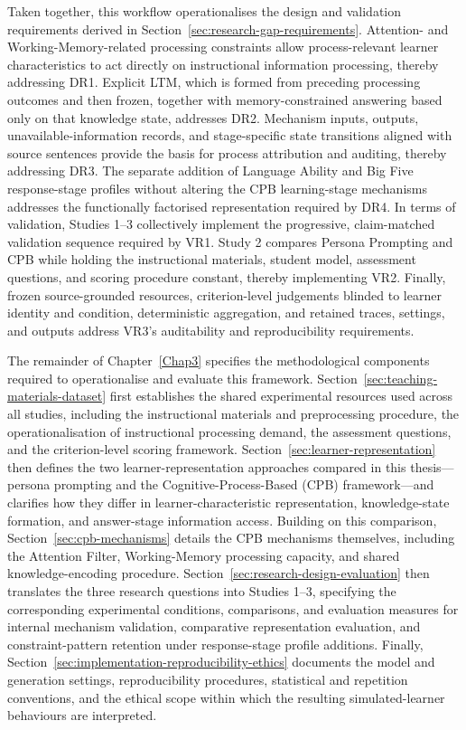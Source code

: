 Taken together, this workflow operationalises the design and validation requirements derived in Section~\ref{sec:research-gap-requirements}. Attention- and Working-Memory-related processing constraints allow process-relevant learner characteristics to act directly on instructional information processing, thereby addressing DR1. Explicit LTM, which is formed from preceding processing outcomes and then frozen, together with memory-constrained answering based only on that knowledge state, addresses DR2. Mechanism inputs, outputs, unavailable-information records, and stage-specific state transitions aligned with source sentences provide the basis for process attribution and auditing, thereby addressing DR3. The separate addition of Language Ability and Big Five response-stage profiles without altering the CPB learning-stage mechanisms addresses the functionally factorised representation required by DR4. In terms of validation, Studies 1--3 collectively implement the progressive, claim-matched validation sequence required by VR1. Study 2 compares Persona Prompting and CPB while holding the instructional materials, student model, assessment questions, and scoring procedure constant, thereby implementing VR2. Finally, frozen source-grounded resources, criterion-level judgements blinded to learner identity and condition, deterministic aggregation, and retained traces, settings, and outputs address VR3's auditability and reproducibility requirements.

The remainder of Chapter~\ref{Chap3} specifies the methodological components required to operationalise and evaluate this framework. Section~\ref{sec:teaching-materials-dataset} first establishes the shared experimental resources used across all studies, including the instructional materials and preprocessing procedure, the operationalisation of instructional processing demand, the assessment questions, and the criterion-level scoring framework. Section~\ref{sec:learner-representation} then defines the two learner-representation approaches compared in this thesis---persona prompting and the Cognitive-Process-Based (CPB) framework---and clarifies how they differ in learner-characteristic representation, knowledge-state formation, and answer-stage information access. Building on this comparison, Section~\ref{sec:cpb-mechanisms} details the CPB mechanisms themselves, including the Attention Filter, Working-Memory processing capacity, and shared knowledge-encoding procedure. Section~\ref{sec:research-design-evaluation} then translates the three research questions into Studies 1--3, specifying the corresponding experimental conditions, comparisons, and evaluation measures for internal mechanism validation, comparative representation evaluation, and constraint-pattern retention under response-stage profile additions. Finally, Section~\ref{sec:implementation-reproducibility-ethics} documents the model and generation settings, reproducibility procedures, statistical and repetition conventions, and the ethical scope within which the resulting simulated-learner behaviours are interpreted.

